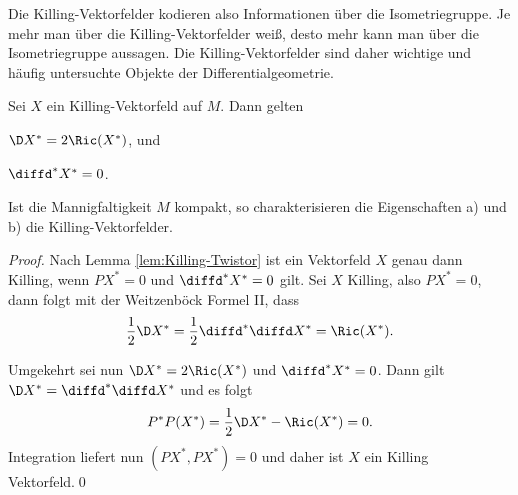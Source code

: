 \documentclass[%
	paper=a5,%
	fleqn,%
	DIV=18,%
	BCOR=0mm,
	fontsize=11pt,
	titlepage=false,%
	bibliography=totoc,
	DIV=18,%
	twoside=true,
	pdftitle=Riemannsche Geometrie,
	pdfauthor=Uwe Semmelmann,
	numbers=noendperiod]%
	{scrbook}
\begin{document}
Die Killing-Vektorfelder kodieren also Informationen über die Isometriegruppe. Je mehr man über die Killing-Vektorfelder weiß, desto mehr kann man über die Isometriegruppe aussagen. Die Killing-Vektorfelder sind daher wichtige und häufig untersuchte Objekte der Differentialgeometrie.


\begin{cor}
Sei $X$ ein Killing-Vektorfeld auf $M$. Dann gelten
\begin{propenum}
\item $\D X^* = 2\Ric(X^*)$, und
\item $\diffd^* X^*  = 0$.\fish
\end{propenum}
Ist die Mannigfaltigkeit $M$ kompakt, so charakterisieren die Eigenschaften a) und b) die Killing-Vektorfelder.\fish
\end{cor}
\begin{proof}
Nach Lemma \ref{lem:Killing-Twistor} ist ein Vektorfeld $X$ genau dann Killing, wenn $PX^* = 0$ und $\diffd^* X^* = 0$ gilt. 
Sei $X$ Killing, also $PX^* = 0$, dann folgt mit der Weitzenböck Formel II, dass
\begin{align*}
\frac{1}{2}\D X^* = \frac{1}{2}\diffd^*\diffd X^* = \Ric(X^*).
\end{align*}

Umgekehrt sei nun $\D X^* = 2\Ric(X^*)$ und $\diffd^* X^* = 0$. Dann gilt $\D X^* = \diffd^*\diffd X^* $ und es folgt
\begin{align*}
P^*P(X^*) = \frac{1}{2}\D X^* - \Ric(X^*) = 0.
\end{align*}
Integration liefert nun $(PX^*,PX^*) = 0$ und daher ist $X$ ein Killing Vektorfeld.\qed
\end{proof}
\end{document}
